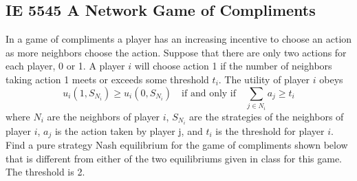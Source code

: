 \documentclass{article}
\begin{document}
\subsection{IE 5545 A Network Game of Compliments}
In a game of compliments a player has an increasing incentive to choose an action as
more neighbors choose the action. Suppose that there are only two actions for each player,
0 or 1. A player $i$ will choose action 1 if the number of neighbors taking action 1 meets
or exceeds some threshold $t_i$. The utility of player $i$ obeys
\[ u_i(1,S_{N_i}) \geq u_i(0,S_{N_i}) \quad \text{if and only if}
  \quad \sum_{j \in N_i} a_j \geq t_i \]
where $N_i$ are the neighbors
of player $i$, $S_{N_i}$ are the strategies of the neighbors of player $i$,
$a_j$ is the action taken by player j, and $t_i$ is the threshold
for player $i$. Find a pure strategy Nash equilibrium for the game of compliments
shown below that is different from either of the two equilibriums
given in class for this game. The threshold is 2.

\vspace{.5in}
\begin{center}
%
\end{center}
\end{document}

